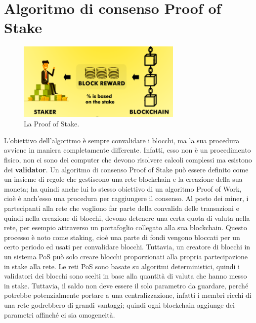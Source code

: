 \documentclass[a4paper,11pt]{report}
\begin{document}
\section{Algoritmo di consenso Proof of Stake}
\begin{figure}[htbp] 
\begin{center}
\includegraphics[width=8cm]{img/pos.png} 
\end{center}
\caption{La Proof of Stake. \cite{stake}}
\end{figure}
L'obiettivo dell'algoritmo è sempre convalidare i blocchi, ma la sua procedura avviene in maniera completamente differente. Infatti, esso non è un procedimento fisico, non ci sono dei computer che devono risolvere calcoli complessi ma esistono dei \textbf{validator}.
Un algoritmo di consenso Proof of Stake può essere definito come un insieme di regole che gestiscono una rete blockchain e la creazione della sua moneta; ha quindi anche lui lo stesso obiettivo di un algoritmo Proof of Work, cioè è anch'esso una procedura per raggiungere il consenso. 
Al posto dei miner, i partecipanti alla rete che vogliono far parte della convalida delle transazioni e quindi nella creazione di blocchi, devono detenere una certa quota di valuta nella rete, per esempio attraverso un portafoglio collegato alla sua blockchain. Questo processo è noto come staking, cioè una parte di fondi vengono bloccati per un certo periodo ed usati per convalidare blocchi. Tuttavia, un creatore di blocchi in un sistema PoS può solo creare blocchi proporzionati alla propria partecipazione in stake alla rete.
Le reti PoS sono basate su algoritmi deterministici, quindi i validatori dei blocchi sono scelti in base alla quantità di valuta che hanno messo in stake. Tuttavia, il saldo non deve essere il solo parametro da guardare, perché potrebbe potenzialmente portare a una centralizzazione, infatti i membri ricchi di una rete godrebbero di grandi vantaggi; quindi ogni blockchain aggiunge dei parametri affinché ci sia omogeneità.
\end{document}

